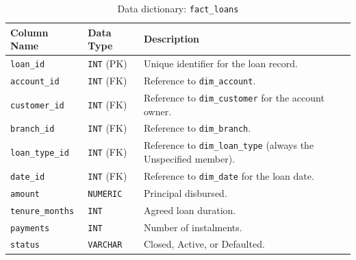 \begin{table}[H]
    \centering
    \renewcommand{\arraystretch}{1.3}
    \begin{tabularx}{\textwidth}{|>{\raggedright\arraybackslash}l|>{\raggedright\arraybackslash}l|>{\raggedright\arraybackslash}X|}
        \hline
        \textbf{Column Name} & \textbf{Data Type} & \textbf{Description} \\
        \hline
        \texttt{loan\_id} & \texttt{INT} (PK) & Unique identifier for the loan record. \\
        \texttt{account\_id} & \texttt{INT} (FK) & Reference to \texttt{dim\_account}. \\
        \texttt{customer\_id} & \texttt{INT} (FK) & Reference to \texttt{dim\_customer} for the account owner. \\
        \texttt{branch\_id} & \texttt{INT} (FK) & Reference to \texttt{dim\_branch}. \\
        \texttt{loan\_type\_id} & \texttt{INT} (FK) & Reference to \texttt{dim\_loan\_type} (always the Unspecified member). \\
        \texttt{date\_id} & \texttt{INT} (FK) & Reference to \texttt{dim\_date} for the loan date. \\
        \texttt{amount} & \texttt{NUMERIC} & Principal disbursed. \\
        \texttt{tenure\_months} & \texttt{INT} & Agreed loan duration. \\
        \texttt{payments} & \texttt{INT} & Number of instalments. \\
        \texttt{status} & \texttt{VARCHAR} & Closed, Active, or Defaulted. \\
        \hline
    \end{tabularx}
    \caption{Data dictionary: \texttt{fact\_loans}}
    \label{tab:dict_loans}
\end{table}

